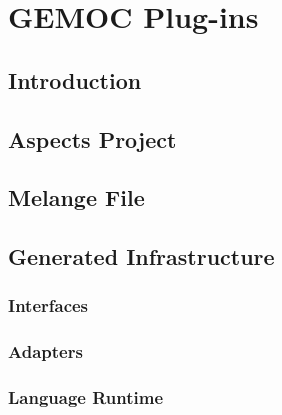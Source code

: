 \chapter{GEMOC Plug-ins}
\section{Introduction}
\section{Aspects Project}
\section{Melange File}
\section{Generated Infrastructure}
\subsection{Interfaces}
\subsection{Adapters}
\subsection{Language Runtime}
